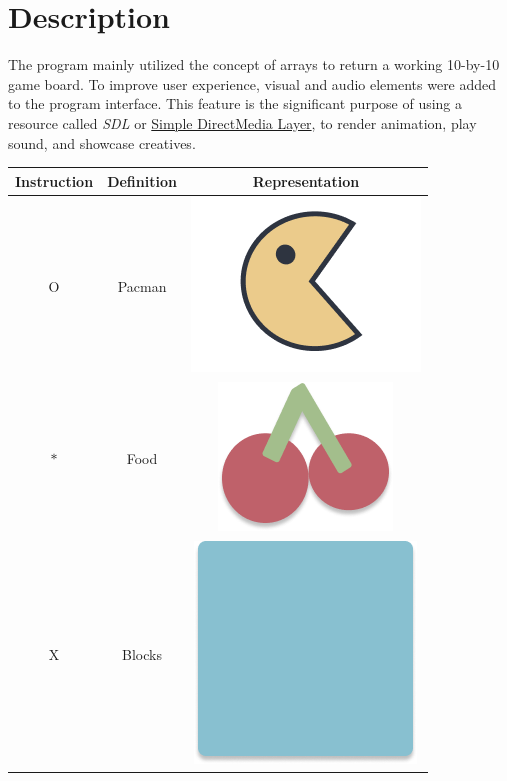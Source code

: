 
\section{Description}

The program mainly utilized the concept of arrays to return a working 10-by-10
game board. To improve user experience, visual and audio elements were added to
the program interface. This feature is the significant purpose of using a
resource called \emph{SDL} or \href{https://www.libsdl.org/}{Simple DirectMedia Layer},
to render animation, play sound, and showcase creatives.

\begin{table}[H]
    \centering
    \def\arraystretch{2.5}
    \begin{tabular}{ c c c }
        \toprule
        Instruction & Definition & Representation \\
        \midrule
        O & Pacman & \includegraphics[scale=0.1]{assets/pacman_sample.png} \\
        $*$ & Food & \includegraphics[scale=0.1]{assets/food_sample.png} \\
        X & Blocks & \includegraphics[scale=0.1]{assets/block_sample.png} \\

\end{tabular}
\end{table}
